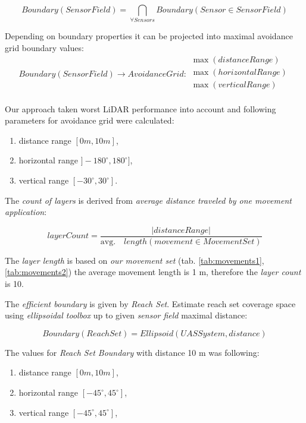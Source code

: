 \begin{equation}
     Boundary(Sensor Field) = \bigcap_{\forall Sensors} Boundary(Sensor \in Sensor Field)
\end{equation}

\noindent Depending on boundary properties it can be projected into maximal avoidance grid boundary values:
\begin{equation}
    Boundary(Sensor Field) \to Avoidance Grid : 
    \begin{gathered}
        \max(distanceRange)\\
        \max(horizontalRange)\\
        \max(verticalRange)\\
    \end{gathered}
\end{equation}

\noindent Our approach taken worst LiDAR performance into account \cite{sabatini2014lidar} and following parameters for avoidance grid were calculated:

\begin{enumerate}
    \item distance range $[0m,10m]$,
    \item horizontal range $]-180^\circ,180^\circ]$,
    \item vertical range $[-30^\circ,30^\circ]$.
\end{enumerate}

\noindent The \emph{count of layers} is derived from \emph{average distance traveled by one movement application}:

\begin{equation}
    layer Count = \frac{|distance Range|}{\text{avg.}\quad length(movement\in Movement Set)}
\end{equation}

\noindent The \emph{layer length} is based on \emph{our movement set} (tab. \ref{tab:movements1}, \ref{tab:movements2}) the average movement length is 1 m, therefore the \emph{layer count} is 10.

The \emph{efficient boundary} is given by  \emph{Reach Set}. Estimate reach set coverage space using \emph{ellipsoidal toolbox} \cite{kurzhanskiy2006ellipsoidal} up to given \emph{sensor field} maximal distance:

\begin{equation}
    Boundary(Reach Set) = Ellipsoid(UAS System,distance)
\end{equation}

\noindent The values for \emph{Reach Set Boundary} with distance 10 m was following:
\begin{enumerate}
    \item distance range $[0m,10m]$,
    \item horizontal range $[-45^\circ,45^\circ]$,
    \item vertical range $[-45^\circ,45^\circ]$,
\end{enumerate}

